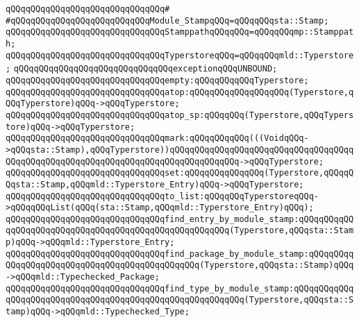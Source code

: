 \verb|qQQqqQQqqQQqqQQqqQQqqQQqqQQqqQQq#|\newline
\verb|#qQQqqQQqqQQqqQQqqQQqqQQqqQQqModule_StampqQQq=qQQqqQQqsta::Stamp;|\newline
\verb|qQQqqQQqqQQqqQQqqQQqqQQqqQQqqQQqStamppathqQQqqQQq=qQQqqQQqmp::Stamppath;|\newline
\newline
\verb|qQQqqQQqqQQqqQQqqQQqqQQqqQQqqQQqTyperstoreqQQq=qQQqqQQqmld::Typerstore;|\newline
\newline
\verb|qQQqqQQqqQQqqQQqqQQqqQQqqQQqqQQqexceptionqQQqUNBOUND;|\newline
\newline
\verb|qQQqqQQqqQQqqQQqqQQqqQQqqQQqqQQqempty:qQQqqQQqqQQqTyperstore;|\newline
\newline
\verb|qQQqqQQqqQQqqQQqqQQqqQQqqQQqqQQqatop:qQQqqQQqqQQqqQQqqQQq(Typerstore,qQQqTyperstore)qQQq->qQQqTyperstore;|\newline
\verb|qQQqqQQqqQQqqQQqqQQqqQQqqQQqqQQqatop_sp:qQQqqQQq(Typerstore,qQQqTyperstore)qQQq->qQQqTyperstore;|\newline
\newline
\verb|qQQqqQQqqQQqqQQqqQQqqQQqqQQqqQQqmark:qQQqqQQqqQQq(((VoidqQQq->qQQqsta::Stamp),qQQqTyperstore))qQQqqQQqqQQqqQQqqQQqqQQqqQQqqQQqqQQqqQQqqQQqqQQqqQQqqQQqqQQqqQQqqQQqqQQqqQQqqQQqqQQq->qQQqTyperstore;|\newline
\verb|qQQqqQQqqQQqqQQqqQQqqQQqqQQqqQQqset:qQQqqQQqqQQqqQQq(Typerstore,qQQqqQQqsta::Stamp,qQQqmld::Typerstore_Entry)qQQq->qQQqTyperstore;|\newline
\newline
\verb|qQQqqQQqqQQqqQQqqQQqqQQqqQQqqQQqto_list:qQQqqQQqTyperstoreqQQq->qQQqqQQqList(qQQq(sta::Stamp,qQQqmld::Typerstore_Entry)qQQq);|\newline
\newline
\verb|qQQqqQQqqQQqqQQqqQQqqQQqqQQqqQQqfind_entry_by_module_stamp:qQQqqQQqqQQqqQQqqQQqqQQqqQQqqQQqqQQqqQQqqQQqqQQqqQQqqQQq(Typerstore,qQQqsta::Stamp)qQQq->qQQqmld::Typerstore_Entry;|\newline
\verb|qQQqqQQqqQQqqQQqqQQqqQQqqQQqqQQqfind_package_by_module_stamp:qQQqqQQqqQQqqQQqqQQqqQQqqQQqqQQqqQQqqQQqqQQqqQQq(Typerstore,qQQqsta::Stamp)qQQq->qQQqmld::Typechecked_Package;|\newline
\verb|qQQqqQQqqQQqqQQqqQQqqQQqqQQqqQQqfind_type_by_module_stamp:qQQqqQQqqQQqqQQqqQQqqQQqqQQqqQQqqQQqqQQqqQQqqQQqqQQqqQQqqQQq(Typerstore,qQQqsta::Stamp)qQQq->qQQqmld::Typechecked_Type;|\newline
